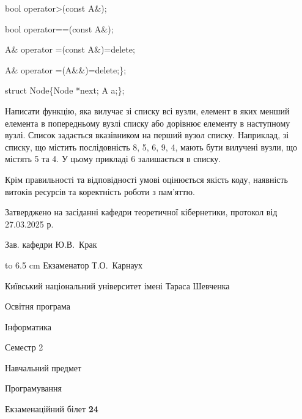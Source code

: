 \documentclass[12pt, ukrainian]{article}
\begin{document}
{\quad  bool operator>(const A\&); 

\quad  bool operator==(const A\&); 

\quad A\& operator =(const A\&)=delete; 

\quad  A\& operator =(A\&\&)=delete;\};

struct Node\{Node *next; A a;\};

 Написати функцію, яка вилучає зі списку всі вузли, елемент в яких менший елемента в попередньому вузлі списку або дорівнює елементу в наступному вузлі. Список задається вказівником на перший вузол списку. Наприклад, зі списку, що містить послідовність 8, 5, 6, 9, 4, мають бути вилучені вузли, що містять 5 та 4. У цьому прикладі 6 залишається в списку.

Крім правильності та відповідності умові оцінюється якість коду, наявність витоків ресурсів та коректність роботи з пам'яттю. 

}
{\smallskip\smallskip \begin {scriptsize} Затверджено на засіданні кафедри теоретичної кібернетики, протокол   від   27.03.2025 р.\par\smallskip\smallskip\smallskip\smallskip
{\parbox {6.5 cm} {Зав. кафедри \dotfill Ю.В.~Крак}}\hspace {0.7cm} {\hbox to 6.5 cm { Екзаменатор \dotfill Т.О.~Карнаух}} \end{scriptsize}}
\newpage
{{\begin {scriptsize}\par
{ \center  Київський національний університет імені Тараса Шевченка \par}
{\parbox {5 cm}{Освітня програма \hfill}{\parbox {7 cm}{Інформатика\hfill}}\parbox {6 cm}{\hfill Семестр 2}}\par
{\parbox {5 cm} {Навчальний предмет \hfill}\parbox {7 cm}{Програмування \hfill}\parbox {6cm}{\hfill}\par}\vspace{-15pt} \end{scriptsize}}{\center Екзаменаційний білет \No \textbf { 24 }\par}}
\end{document}
